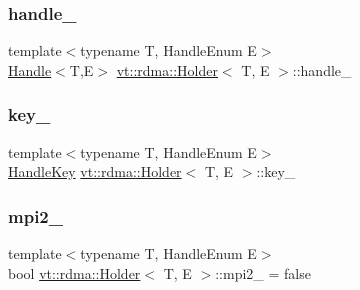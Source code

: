 \mbox{\label{structvt_1_1rdma_1_1_holder_a0995b9b9adfce492d7d3dead1ed8ac7a}} 
\subsubsection{\texorpdfstring{handle\+\_\+}{handle\_}}
{\footnotesize\ttfamily template$<$typename T, Handle\+Enum E$>$ \\
\hyperlink{structvt_1_1rdma_1_1_handle}{Handle}$<$T,E$>$ \hyperlink{structvt_1_1rdma_1_1_holder}{vt\+::rdma\+::\+Holder}$<$ T, E $>$\+::handle\+\_\+\hspace{0.3cm}{\ttfamily [private]}}

\mbox{\label{structvt_1_1rdma_1_1_holder_a32fc545bf53fbbd4002369112e5f02e0}} 
\subsubsection{\texorpdfstring{key\+\_\+}{key\_}}
{\footnotesize\ttfamily template$<$typename T, Handle\+Enum E$>$ \\
\hyperlink{structvt_1_1rdma_1_1_handle_key}{Handle\+Key} \hyperlink{structvt_1_1rdma_1_1_holder}{vt\+::rdma\+::\+Holder}$<$ T, E $>$\+::key\+\_\+\hspace{0.3cm}{\ttfamily [private]}}

\mbox{\label{structvt_1_1rdma_1_1_holder_aecfc6828df1f361fa24e2780b07b6d56}} 
\subsubsection{\texorpdfstring{mpi2\+\_\+}{mpi2\_}}
{\footnotesize\ttfamily template$<$typename T, Handle\+Enum E$>$ \\
bool \hyperlink{structvt_1_1rdma_1_1_holder}{vt\+::rdma\+::\+Holder}$<$ T, E $>$\+::mpi2\+\_\+ = false\hspace{0.3cm}{\ttfamily [private]}}

